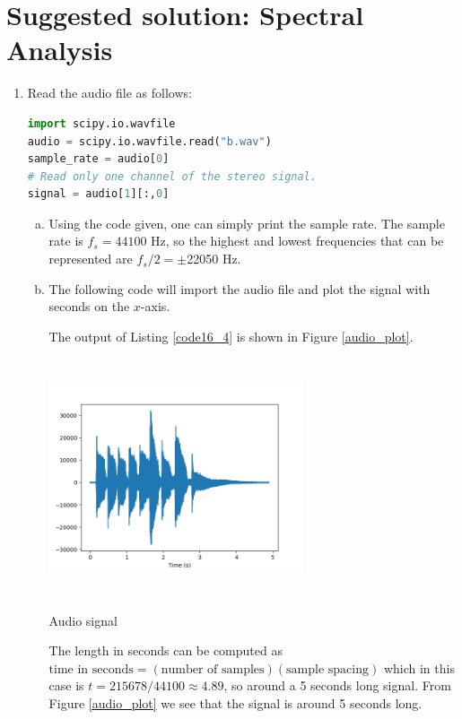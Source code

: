 
\newpage
\section{Suggested solution: Spectral Analysis}

\begin{enumerate}
  \item Read the audio file as follows:
        \begin{lstlisting}[language=Python]
import scipy.io.wavfile
audio = scipy.io.wavfile.read("b.wav")
sample_rate = audio[0]
# Read only one channel of the stereo signal.
signal = audio[1][:,0]
\end{lstlisting}

        \begin{enumerate}[a)]
          \item Using the code given, one can simply print the sample rate.
                The sample rate is $f_s=44100$ Hz, so the highest and lowest frequencies that can be represented are $f_{s}/2=\pm$22050 Hz.

          \item The following code will import the audio file and plot the signal with seconds on the $x$-axis.
                

                The output of Listing \ref{code16_4} is shown in Figure \ref{audio_plot}.
                \begin{marginfigure}
                  \centering
                  \includegraphics[width=7.5cm,height=7.0cm]{ch16/figures/audio.png}
                  \caption{Audio signal}
                  \label{audio_plot}
                \end{marginfigure}
                The length in seconds can be computed as $\text{time in seconds}=(\text{number of samples})(\text{sample spacing})$
                which in this case is $t=215678/44100\approx 4.89$, so around a 5 seconds long signal. From Figure \ref{audio_plot} we see that the signal is around 5 seconds long.


\end{enumerate}
\end{enumerate}
